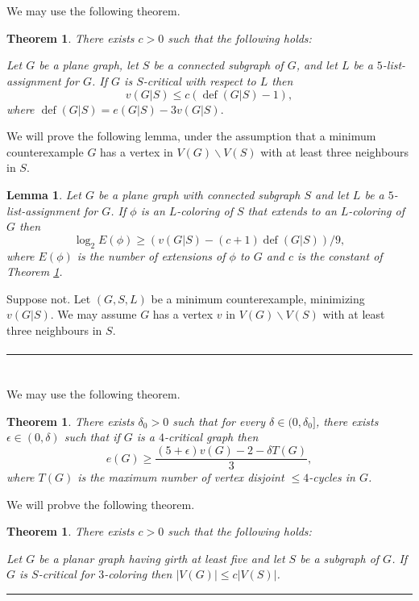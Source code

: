 \documentclass[letterpaper,12pt,oneside,onecolumn]{article}
\newenvironment{proof}{{\bf Proof:  }}{\hfill\rule{2mm}{2mm}}
\newtheorem{lemma}[fact]{Lemma}
\newtheorem{theorem}[fact]{Theorem}
\DeclareMathOperator{\defi}{def}
\begin{document}
\section{}
We may use the following theorem.
\begin{theorem}\label{th:def}
	There exists $c>0$ such that the following holds:
	
	Let $G$ be a plane graph, let $S$ be a connected subgraph of $G$, and let $L$ be a $5$-list-assignment for $G$. If $G$ is $S$-critical with respect to $L$ then
	$$v(G|S) \leq c(\defi(G|S) - 1),$$
	where $\defi(G|S) = e(G|S) - 3v(G|S).$
\end{theorem}
We will prove the following lemma, under the assumption that a minimum counterexample $G$ has a vertex in $V(G)\backslash V(S)$ with at least three neighbours in $S$.
\begin{lemma}
	Let $G$ be a plane graph with connected subgraph $S$ and let $L$ be a $5$-list-assignment for $G$. If $\phi$ is an $L$-coloring of $S$ that extends to an $L$-coloring of $G$ then
	$$\log_2 E(\phi) \geq (v(G|S) - (c+1)\defi(G|S))/9,$$
	where $E(\phi)$ is the number of extensions of $\phi$ to $G$ and $c$ is the constant of Theorem \ref{th:def}.
\end{lemma}
\begin{proof}
	Suppose not. Let $(G,S,L)$ be a minimum counterexample, minimizing $v(G|S)$. We may assume $G$ has a vertex $v$ in $V(G)\backslash V(S)$ with at least three neighbours in $S$.
	\paragraph{}
	 
\end{proof}

\section{}
\paragraph{}
We may use the following theorem.
\begin{theorem}\label{th:four}
	There exists $\delta_0 >0$ such that for every $\delta \in (0,\delta_0]$, there exists $\epsilon \in (0,\delta)$ such that if $G$ is a $4$-critical graph then
	$$e(G) \geq \frac{(5+\epsilon)v(G) - 2 - \delta T(G)}{3},$$
	where $T(G)$ is the maximum number of vertex disjoint $\leq 4$-cycles in $G$.
\end{theorem}
We will probve the following theorem.
\begin{theorem}
	There exists $c>0$ such that the following holds:
	
	Let $G$ be a planar graph having girth at least five and let $S$ be a subgraph of $G$. If $G$ is $S$-critical for $3$-coloring then $|V(G)| \leq c|V(S)|$.
\end{theorem}
\begin{proof}
	
\end{proof}
\end{document}
